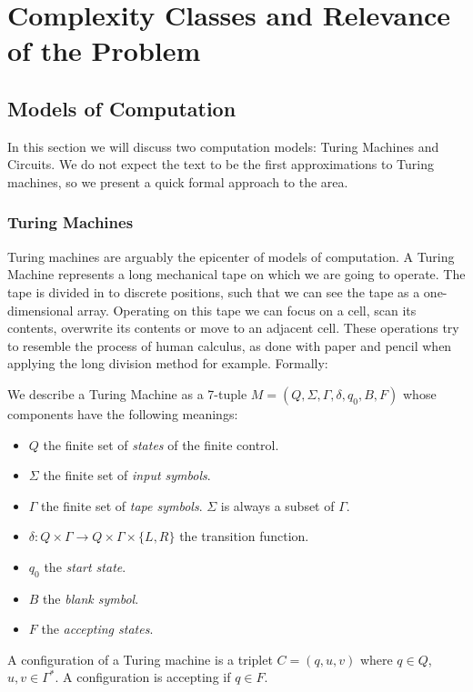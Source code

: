 \chapter{Complexity Classes and Relevance of the Problem}
\section{Models of Computation}

In this section we will discuss two computation models: Turing Machines and Circuits. We do not expect the text to be the first approximations to Turing machines, so we present a quick formal approach to the area. 

\subsection{Turing Machines}
Turing machines are arguably the epicenter of  models of computation. A Turing Machine  represents a long mechanical tape on which we are going to operate. The tape is divided in to discrete positions, such that we can see the tape as a one-dimensional array. Operating on this tape we can focus on a cell, scan its contents, overwrite  its contents or move to an adjacent cell. These operations try to resemble the process of human calculus, as done with paper and pencil when applying the long division method  for example. Formally:

\begin{definition} We describe a Turing Machine as a 7-tuple $M=(Q, \Sigma, \Gamma, \delta, q_0, B, F)$ whose components have the following meanings:
  \begin{itemize}
  \item $Q$ the finite set of \emph{states} of the finite control.
  \item $\Sigma$ the finite set of \emph{input symbols}.
  \item $\Gamma$ the finite set of \emph{tape symbols}. $\Sigma$ is always a subset of $\Gamma$.
  \item  $\delta: Q\times \Gamma \to Q\times\Gamma\times\{L,R\}$ the transition function.
  \item $q_0$ the \emph{start state}.
  \item $B$ the \emph{blank symbol}.
  \item $F$ the \emph{accepting states}.
  \end{itemize}

  A configuration of a Turing machine is a triplet $C=(q,u,v)$ where $q\in Q$, $u,v\in \Gamma^*$. A configuration is accepting if $q\in F$.
\end{definition}

